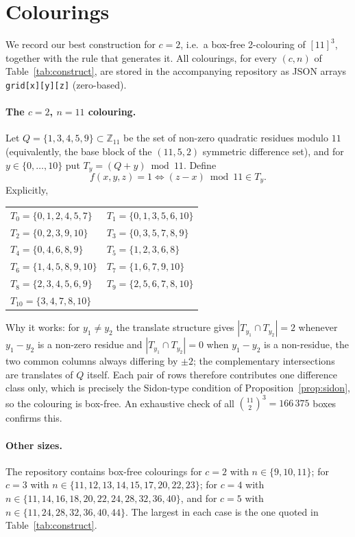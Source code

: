 \documentclass[11pt]{article}
\theoremstyle{definition}
\begin{document}
\appendix

\section{Colourings}\label{app:colourings}

We record our best construction for $c=2$, i.e.\ a box-free 2-colouring of $[11]^3$,
together with the rule that generates it. All colourings, for every $(c,n)$ of
Table~\ref{tab:construct}, are stored in the accompanying repository as JSON arrays
\texttt{grid[x][y][z]} (zero-based).

\paragraph{The $c=2$, $n=11$ colouring.} Let $Q=\{1,3,4,5,9\}\subset\mathbb{Z}_{11}$ be
the set of non-zero quadratic residues modulo $11$ (equivalently, the base block of the
$(11,5,2)$ symmetric difference set), and for $y\in\{0,\dots,10\}$ put
$T_y=(Q+y)\bmod 11$. Define
\[
f(x,y,z)=1\iff (z-x)\bmod 11\in T_y .
\]
Explicitly,
\begin{center}
\begin{tabular}{ll}
$T_0=\{0,1,2,4,5,7\}$ & $T_1=\{0,1,3,5,6,10\}$ \\
$T_2=\{0,2,3,9,10\}$ & $T_3=\{0,3,5,7,8,9\}$ \\
$T_4=\{0,4,6,8,9\}$ & $T_5=\{1,2,3,6,8\}$ \\
$T_6=\{1,4,5,8,9,10\}$ & $T_7=\{1,6,7,9,10\}$ \\
$T_8=\{2,3,4,5,6,9\}$ & $T_9=\{2,5,6,7,8,10\}$ \\
$T_{10}=\{3,4,7,8,10\}$ & \\
\end{tabular}
\end{center}
Why it works: for $y_1\neq y_2$ the translate structure gives
$|T_{y_1}\cap T_{y_2}|=2$ whenever $y_1-y_2$ is a non-zero residue and $|T_{y_1}\cap
T_{y_2}|=0$ when $y_1-y_2$ is a non-residue, the two common columns always differing by
$\pm2$; the complementary intersections are translates of $Q$ itself. Each pair of rows
therefore contributes one difference class only, which is precisely the Sidon-type
condition of Proposition~\ref{prop:sidon}, so the colouring is box-free. An exhaustive
check of all $\binom{11}{2}^3=166\,375$ boxes confirms this.

\paragraph{Other sizes.} The repository contains box-free colourings for $c=2$ with
$n\in\{9,10,11\}$; for $c=3$ with $n\in\{11,12,13,14,15,17,20,22,23\}$; for $c=4$
with $n\in\{11,14,16,18,20,22,24,28,32,36,40\}$, and for $c=5$ with
$n\in\{11,24,28,32,36,40,44\}$. The largest in each case is the one
quoted in Table~\ref{tab:construct}.
\end{document}
